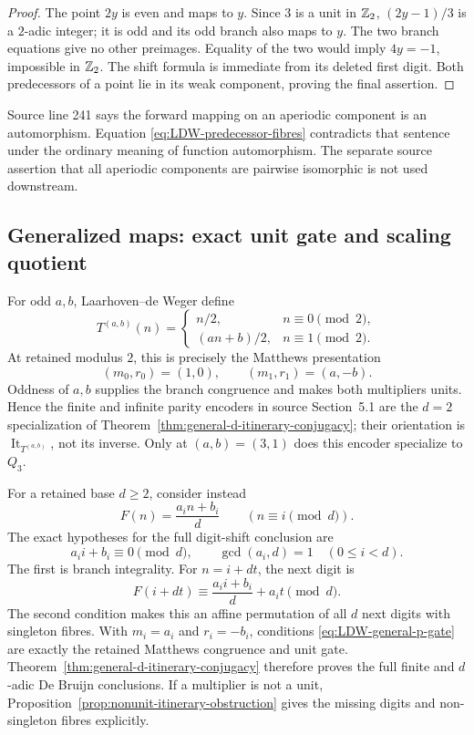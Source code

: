 \begin{proof}
The point $2y$ is even and maps to $y$.  Since $3$ is a unit in $\mathbb{Z}_{2}$,
$(2y-1)/3$ is a $2$-adic integer; it is odd and its odd branch also maps to
$y$.  The two branch equations give no other preimages.  Equality of the two
would imply $4y=-1$, impossible in $\mathbb{Z}_{2}$.  The shift formula is immediate
from its deleted first digit.  Both predecessors of a point lie in its weak
component, proving the final assertion.
\end{proof}

Source line 241 says the forward mapping on an aperiodic component is an
automorphism.  Equation \eqref{eq:LDW-predecessor-fibres} contradicts that
sentence under the ordinary meaning of function automorphism.  The separate
source assertion that all aperiodic components are pairwise isomorphic is not
used downstream.

\subsection{Generalized maps: exact unit gate and scaling quotient}

For odd $a,b$, Laarhoven--de Weger define
\[
 T^{(a,b)}(n)=
 \begin{cases}
  n/2,&n\equiv0\pmod2,\\
  (an+b)/2,&n\equiv1\pmod2.
 \end{cases}
\]
At retained modulus $2$, this is precisely the Matthews presentation
\[
 (m_0,r_0)=(1,0),
 \qquad
 (m_1,r_1)=(a,-b).
\]
Oddness of $a,b$ supplies the branch congruence and makes both multipliers
units.  Hence the finite and infinite parity encoders in source Section~5.1
are the $d=2$ specialization of
Theorem~\ref{thm:general-d-itinerary-conjugacy}; their orientation is
$\operatorname{It}_{T^{(a,b)}}$, not its inverse.  Only at
$(a,b)=(3,1)$ does this encoder specialize to $Q_3$.

For a retained base $d\geq2$, consider instead
\begin{equation}
\label{eq:LDW-general-p-branch}
 F(n)=\frac{a_i n+b_i}{d}
 \qquad(n\equiv i\pmod d).
\end{equation}
The exact hypotheses for the full digit-shift conclusion are
\begin{equation}
\label{eq:LDW-general-p-gate}
 a_i i+b_i\equiv0\pmod d,
 \qquad
 \gcd(a_i,d)=1
 \quad(0\leq i<d).
\end{equation}
The first is branch integrality.  For $n=i+dt$, the next digit is
\begin{equation}
\label{eq:LDW-next-digit-affine}
 F(i+dt)\equiv \frac{a_i i+b_i}{d}+a_it\pmod d.
\end{equation}
The second condition makes this an affine permutation of all $d$ next digits
with singleton fibres.  With $m_i=a_i$ and $r_i=-b_i$, conditions
\eqref{eq:LDW-general-p-gate} are exactly the retained Matthews congruence and
unit gate.  Theorem~\ref{thm:general-d-itinerary-conjugacy} therefore proves
the full finite and $d$-adic De Bruijn conclusions.  If a multiplier is not a
unit, Proposition~\ref{prop:nonunit-itinerary-obstruction} gives the missing
digits and non-singleton fibres explicitly.

